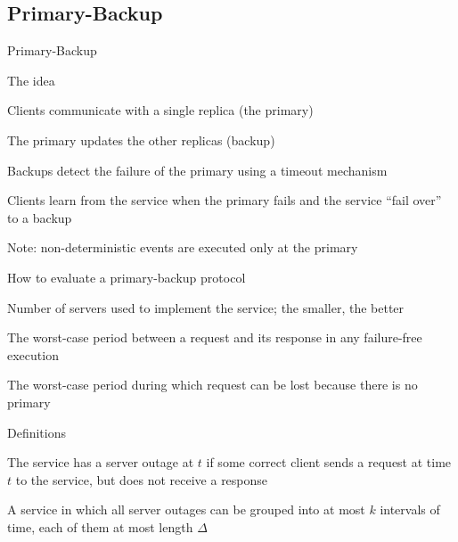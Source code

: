 \subsection{Primary-Backup}

\begin{frame}{Primary-Backup}

\begin{block}{The idea}
\BIL
\item Clients communicate with a single replica (the \alert{primary})
\item The primary updates the other replicas (\alert{backup})
\item Backups detect the failure of the primary using a timeout mechanism
\item Clients learn from the service when the primary fails and the service “fail over” to a backup
\item Note: non-deterministic events are executed only at the primary
\EIL
\end{block}

\end{frame}

\begin{frame}{How to evaluate a primary-backup protocol}

\begin{definition}
Number of servers used to implement the service; the smaller, the better
\end{definition}

\bigskip
\begin{definition}
The worst-case period between a request and its response in any failure-free execution
\end{definition}

\bigskip
\begin{definition}
The worst-case period during which request can be lost because there is no primary
\end{definition}

\end{frame}

\begin{frame}{Definitions}

\begin{definition}
The service has a server outage at $t$ if some correct client sends a request
at time $t$ to the service, but does not receive a response
\end{definition}

\bigskip
\begin{definition}
A service in which all server outages can be grouped into at most $k$
intervals of time, each of them at most length $\Delta$
\end{definition}

\end{frame}


